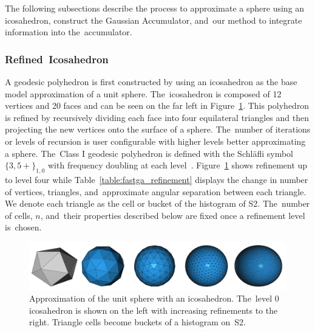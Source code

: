 The following subsections describe the process to approximate a sphere using an icosahedron, construct the Gaussian Accumulator, and~our method to integrate information into the~accumulator. 

\subsubsection{Refined~Icosahedron}\label{sec:ch3_methods_fastga_ico}

A geodesic polyhedron is first constructed by using an icosahedron as the base model approximation of a unit sphere. The~icosahedron is composed of 12 vertices and 20 faces and can be seen on the far left in Figure~\ref{fig:ch3_fastga_refinement}. This polyhedron is refined by recursively dividing each face into four equilateral triangles and then projecting the new vertices onto the surface of a sphere. The~number of iterations or levels of recursion is user configurable with higher levels better approximating a sphere. The~Class I geodesic polyhedron is defined with the Schläfli symbol $\{3,5+\}_{1,0}$ with frequency doubling at each level~\cite{wenninger_spherical_1999}. Figure~\ref{fig:ch3_fastga_refinement} shows refinement up to level four while Table~\ref{table:fastga_refinement} displays the change in number of vertices, triangles, and~approximate angular separation between each triangle. We denote each triangle as the cell or bucket of the histogram of S2. The~number of cells, $n$, and~their properties described below are  fixed once a refinement level is~chosen.

\begin{figure}[H]
    \centering
    \includegraphics[width=.60\linewidth]{chapter_3_polylidar3d/imgs/fastga_ico_refinement_v2.png}
    \caption{Approximation of the unit sphere with an icosahedron. The~level 0 icosahedron is shown on the  left with increasing refinements to the right.  Triangle cells become buckets of a histogram on~S2. }
    \label{fig:ch3_fastga_refinement}
\end{figure}
\unskip

